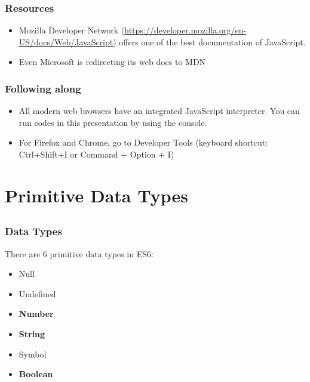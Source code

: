 \documentclass[handout,12pt]{beamer}
\begin{document}
	\begin{frame}
		\frametitle{Resources}
		\begin{itemize}
			\item Mozilla Developer Network (\url{https://developer.mozilla.org/en-US/docs/Web/JavaScript}) offers one of the best documentation of JavaScript.
			\item Even Microsoft is redirecting its web docs to MDN\footnotemark
		\end{itemize}
	\end{frame}
	
	\begin{frame}
		\frametitle{Following along}
		\begin{itemize}
			\item All modern web browsers have an integrated JavaScript interpreter. You can run codes in this presentation by using the console.
			\item For Firefox and Chrome, go to \alert{Developer Tools} (keyboard shortcut: Ctrl+Shift+I or Command + Option + I)
		\end{itemize}
	\end{frame}
	
\section{Primitive Data Types}
\subsection{}
\begin{frame}[fragile]
	\frametitle{Data Types}
	There are 6 primitive data types in ES6:
	\begin{itemize}
		\item Null
		\item Undefined
		\item \textbf{Number}
		\item \textbf{String}
		\item Symbol
		\item \textbf{Boolean}
	\end{itemize}
\end{frame}
\end{document}
